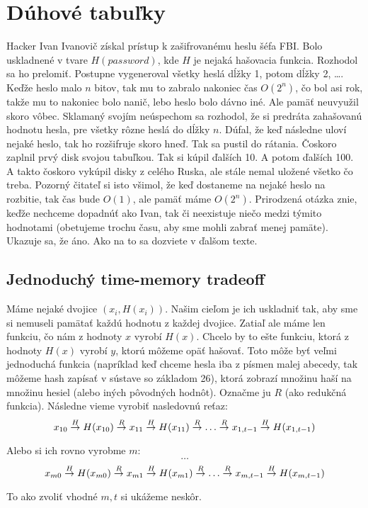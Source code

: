 \section{Dúhové tabuľky}

Hacker Ivan Ivanovič získal prístup k zašifrovanému heslu šéfa FBI. Bolo uskladnené v tvare
$H(password)$, kde $H$ je nejaká hašovacia funkcia. Rozhodol sa ho prelomiť.
Postupne vygeneroval všetky heslá dĺžky 1, potom dĺžky 2, \dots. Keďže heslo malo $n$ bitov, tak
mu to zabralo nakoniec čas $O(2^n)$, čo bol asi rok, takže mu to nakoniec bolo nanič, lebo heslo bolo dávno iné.
 Ale pamäť neuvyužil skoro vôbec. Sklamaný svojím neúspechom sa rozhodol, že si 
predráta zahašovanú hodnotu hesla, pre všetky rôzne heslá do dĺžky $n$. Dúfal, že
keď následne uloví nejaké heslo, tak ho rozšifruje skoro hneď.  Tak sa pustil do rátania.
Čoskoro zaplnil prvý disk svojou tabuľkou. Tak si kúpil ďalších 10. A potom ďalších 100.
A takto čoskoro vykúpil disky z celého Ruska, ale stále nemal uložené všetko čo treba.
Pozorný čitateľ si isto všimol, že keď dostaneme na nejaké heslo na rozbitie, tak čas
bude $O(1)$, ale pamäť máme $O(2^n)$. Prirodzená otázka znie, keďže nechceme dopadnúť ako Ivan, tak
či neexistuje niečo medzi týmito hodnotami (obetujeme trochu času, aby sme mohli zabrať menej pamäte).
Ukazuje sa, že áno. Ako na to sa dozviete v ďalšom texte.

\subsection{Jednoduchý time-memory tradeoff}
Máme nejaké dvojice $(x_i, H(x_i))$. Našim cieľom je ich uskladniť tak, aby sme si nemuseli
pamätať každú hodnotu z každej dvojice. 
Zatiaľ ale máme len funkciu, čo nám z hodnoty $x$ vyrobí $H(x)$. Chcelo by to ešte funkciu, ktorá
z hodnoty $H(x)$ vyrobí $y$, ktorú môžeme opäť hašovať. Toto môže byť veľmi jednoduchá funkcia (napríklad keď chceme hesla iba
z písmen malej abecedy, tak môžeme hash zapísať v sústave so základom 26), ktorá
zobrazí množinu haší na množinu hesiel (alebo iných pôvodných hodnôt). Označme ju $R$ (ako redukčná funkcia).
Následne vieme vyrobiť nasledovnú reťaz:
$$x_{10} \toa{H} H(x_{10}) \toa{R} x_{11} \toa{H} H(x_{11}) \toa{R} \dots \toa{R} x_{1,t-1} \toa{H} H(x_{1,t-1})$$ 

Alebo si ich rovno vyrobme $m$:
$$\dots$$
$$x_{m0} \toa{H} H(x_{m0}) \toa{R} x_{m1} \toa{H} H(x_{m1}) \toa{R} \dots \toa{R} x_{m,t-1} \toa{H} H(x_{m,t-1})$$ 

To ako zvoliť vhodné $m, t$ si ukážeme neskôr.

